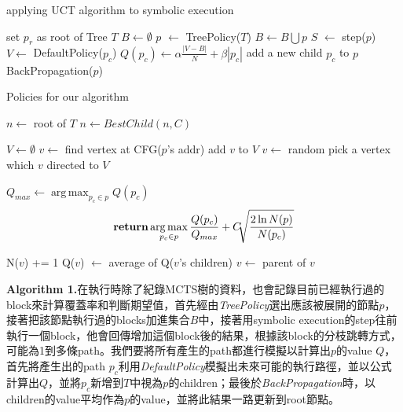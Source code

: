 \documentclass[12pt,a4paper,oneside]{book}
\DeclareMathOperator*{\argmax}{arg\,max}
\begin{document}
\begin{algorithm}[h]
  \caption{applying UCT algorithm to symbolic execution}
  \begin{algorithmic}[1]
    \State set $p_r$ as root of Tree $T$
    \State $B \leftarrow \emptyset$
      \State $p$ $\leftarrow$ TreePolicy($T$)
      \State $B \leftarrow B \bigcup p$
      \State $S$ $\leftarrow$ step($p$)
      	\State $V \leftarrow$ DefaultPolicy($p_c$)
        \State $Q(p_c) \leftarrow \alpha \frac{|V-B|}{N} + \beta|p_c|$
        \State add a new child $p_c$ to $p$
      \EndFor
      \State BackPropagation($p$)
    \EndWhile
    \EndFunction
  \end{algorithmic}
\end{algorithm}

\begin{algorithm}[h]
  \caption{Policies for our algorithm}
  \begin{algorithmic}[]
    	\State $n \leftarrow$ root of $T$
            	\State {}
            \Else
            	\State $n \leftarrow BestChild(n,C)$
            \EndIf
        \EndWhile
    \EndFunction
    \item[]
    	\State $V \leftarrow \emptyset$
          \State $v \leftarrow$ find vertex at CFG($p$'s addr)
              \State add $v$ to $V$
              \State $v \leftarrow$ random pick a vertex which $v$ directed to
          \EndFor
        \EndFor
        \State \Return $V$
    \EndFunction
    \item[]
    	\State $Q_{max} \leftarrow \operatorname*{arg\,max}_{p_c \in p} Q(p_c)$
    	\State \[ \Return \argmax_{p_c \in p} \frac{Q(p_c)}{Q_{max}}+C\sqrt[]{\frac{2\ln N(p)}{N(p_c)}} \]
    \EndFunction
    \item[]
    	\State N($v$) += 1
		\State Q($v$) $\leftarrow$ average of Q($v$'s children)
    \State $v \leftarrow$ parent of $v$
    \EndWhile
    \EndFunction
  \end{algorithmic}
\end{algorithm}
  
\textbf{Algorithm 1.}在執行時除了紀錄MCTS樹的資料，也會記錄目前已經執行過的block來計算覆蓋率和判斷期望值，首先經由\textit{TreePolicy}選出應該被展開的節點$p$，接著把該節點執行過的blocks加進集合$B$中，接著用symbolic execution的step往前執行一個block，他會回傳增加這個block後的結果，根據該block的分枝跳轉方式，可能為1到多條path。我們要將所有產生的path都進行模擬以計算出$p$的value $Q$，首先將產生出的path $p_c$利用\textit{DefaultPolicy}模擬出未來可能的執行路徑，並以公式計算出$Q$，並將$p_c$新增到$T$中視為$p$的children；最後於\textit{BackPropagation}時，以children的value平均作為$p$的value，並將此結果一路更新到root節點。
  
\end{document}
